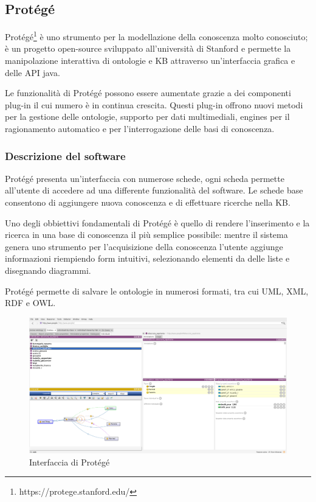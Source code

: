 \subsection{Protégé}
Protégé\footnote{https://protege.stanford.edu/} è uno strumento per la modellazione della conoscenza molto conosciuto; è un progetto open-source sviluppato all'università di Stanford e permette la manipolazione interattiva di ontologie e KB attraverso un'interfaccia grafica e delle API java.

Le funzionalità di Protégé possono essere aumentate grazie a dei componenti plug-in il cui numero è in continua crescita. Questi plug-in offrono nuovi metodi per la gestione delle ontologie, supporto per dati multimediali, engines per il ragionamento automatico e per l'interrogazione delle basi di conoscenza\cite{sivakumar2011ontology}.
\subsubsection{Descrizione del software}
Protégé presenta un'interfaccia con numerose schede, ogni scheda permette all'utente di accedere ad una differente funzionalità del software. Le schede base consentono di aggiungere nuova conoscenza e di effettuare ricerche nella KB.

Uno degli obbiettivi fondamentali di Protégé è quello di rendere l'inserimento e la ricerca in una base di conoscenza il più semplice possibile: mentre il sistema genera uno strumento per l'acquisizione della conoscenza l'utente aggiunge informazioni riempiendo form intuitivi, selezionando elementi da delle liste e disegnando diagrammi.

Protégé permette di salvare le ontologie in numerosi formati, tra cui UML, XML, RDF e OWL.
\begin{figure}[h]
	\centering
	\includegraphics[width=\textwidth]{Picture/interface_protege.png}
	\caption{Interfaccia di Protégé}
\end{figure}
